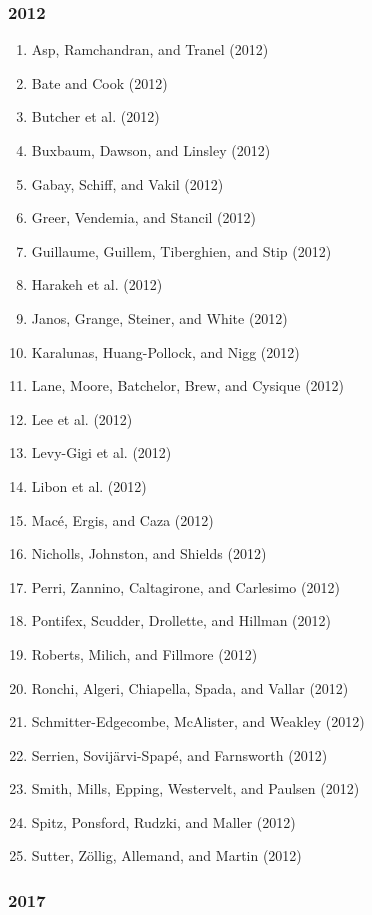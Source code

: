 \documentclass[english,man]{apa6}
\providecommand{\tightlist}{%
  \setlength{\itemsep}{0pt}\setlength{\parskip}{0pt}}
\begin{document}
\subsubsection{2012}\label{section-38}

\begin{enumerate}
\def\labelenumi{\arabic{enumi})}
\tightlist
\item
  Asp, Ramchandran, and Tranel (2012)
\item
  Bate and Cook (2012)
\item
  Butcher et al. (2012)
\item
  Buxbaum, Dawson, and Linsley (2012)
\item
  Gabay, Schiff, and Vakil (2012)
\item
  Greer, Vendemia, and Stancil (2012)
\item
  Guillaume, Guillem, Tiberghien, and Stip (2012)
\item
  Harakeh et al. (2012)
\item
  Janos, Grange, Steiner, and White (2012)
\item
  Karalunas, Huang-Pollock, and Nigg (2012)
\item
  Lane, Moore, Batchelor, Brew, and Cysique (2012)
\item
  Lee et al. (2012)
\item
  Levy-Gigi et al. (2012)
\item
  Libon et al. (2012)
\item
  Macé, Ergis, and Caza (2012)
\item
  Nicholls, Johnston, and Shields (2012)
\item
  Perri, Zannino, Caltagirone, and Carlesimo (2012)
\item
  Pontifex, Scudder, Drollette, and Hillman (2012)
\item
  Roberts, Milich, and Fillmore (2012)
\item
  Ronchi, Algeri, Chiapella, Spada, and Vallar (2012)
\item
  Schmitter-Edgecombe, McAlister, and Weakley (2012)
\item
  Serrien, Sovijärvi-Spapé, and Farnsworth (2012)
\item
  Smith, Mills, Epping, Westervelt, and Paulsen (2012)
\item
  Spitz, Ponsford, Rudzki, and Maller (2012)
\item
  Sutter, Zöllig, Allemand, and Martin (2012)
\end{enumerate}

\subsubsection{2017}\label{section-39}
\end{document}
